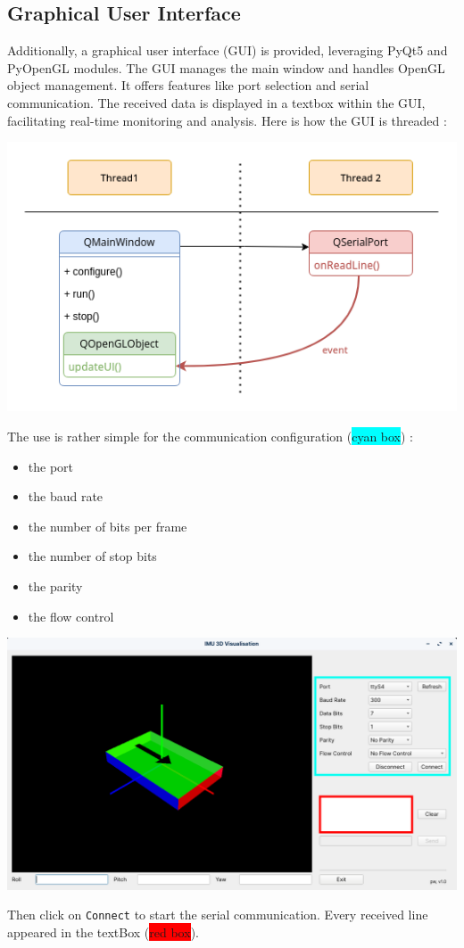 \subsection{Graphical User Interface}
Additionally, a graphical user interface (GUI) is provided, leveraging PyQt5 and PyOpenGL modules. The GUI manages the main window and handles OpenGL object management. It offers features like port selection and serial communication. The received data is displayed in a textbox within the GUI, facilitating real-time monitoring and analysis.
Here is how the GUI is threaded :
\begin{center}
    \includegraphics[width=0.65\linewidth]{./projects/pmodnav/gui_threads.png}
\end{center}
The use is rather simple for the communication configuration (\colorbox{cyan}{cyan box}) :
\begin{itemize}
    \item the port
    \item the baud rate
    \item the number of bits per frame
    \item the number of stop bits
    \item the parity
    \item the flow control
\end{itemize}
\begin{center}
    \includegraphics[width=0.65\linewidth]{./projects/pmodnav/gui_window.png}
\end{center}
Then click on \texttt{Connect} to start the serial communication. Every received line appeared in the textBox (\colorbox{red}{red box}).

